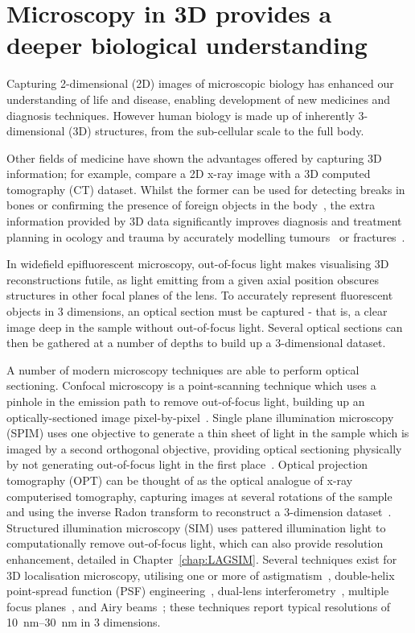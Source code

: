 \section{Microscopy in 3D provides a deeper biological understanding}
Capturing 2-dimensional (2D) images of microscopic biology has enhanced our understanding of life and disease, enabling development of new medicines and diagnosis techniques. 
However human biology is made up of inherently 3-dimensional (3D) structures, from the sub-cellular scale to the full body. 

Other fields of medicine have shown the advantages offered by capturing 3D information; for example, compare a 2D x-ray image with a 3D computed tomography (CT) dataset. 
Whilst the former can be used for detecting breaks in bones or confirming the presence of foreign objects in the body~\cite{markose2009three}, the extra information provided by 3D data significantly improves diagnosis and treatment planning in ocology and trauma by accurately modelling tumours~\cite{zhang2013thin} or fractures~\cite{rangarajan2013three}. 

In widefield epifluorescent microscopy, out-of-focus light makes visualising 3D reconstructions futile, as light emitting from a given axial position obscures structures in other focal planes of the lens. 
To accurately represent fluorescent objects in 3 dimensions, an optical section must be captured - that is, a clear image deep in the sample without out-of-focus light. %
Several optical sections can then be gathered at a number of depths to build up a 3-dimensional dataset. 

A number of modern microscopy techniques are able to perform optical sectioning. 
Confocal microscopy is a point-scanning technique which uses a pinhole in the emission path to remove out-of-focus light, building up an optically-sectioned image pixel-by-pixel~\cite{white1987evaluation, marvin1961microscopy}. 
Single plane illumination microscopy (SPIM) uses one objective to generate a thin sheet of light in the sample which is imaged by a second orthogonal objective, providing optical sectioning physically by not generating out-of-focus light in the first place~\cite{huisken2004optical}. 
Optical projection tomography (OPT) can be thought of as the optical analogue of x-ray computerised tomography, capturing images at several rotations of the sample and using the inverse Radon transform to reconstruct a 3-dimension dataset~\cite{sharpe2002optical}. 
Structured illumination microscopy (SIM) uses pattered illumination light to computationally remove out-of-focus light, which can also provide resolution enhancement, detailed in Chapter~\ref{chap:LAGSIM}. 
Several techniques exist for 3D localisation microscopy, utilising one or more of astigmatism~\cite{huang2008three}, double-helix point-spread function (PSF) engineering~\cite{pavani2009three}, dual-lens interferometry~\cite{shtengel2009interferometric}, multiple focus planes~\cite{toprak2007three}, and Airy beams~\cite{jia2014isotropic}; these techniques report typical resolutions of \SIrange[range-phrase=--]{10}{30}{\nano\metre} in 3 dimensions. 

